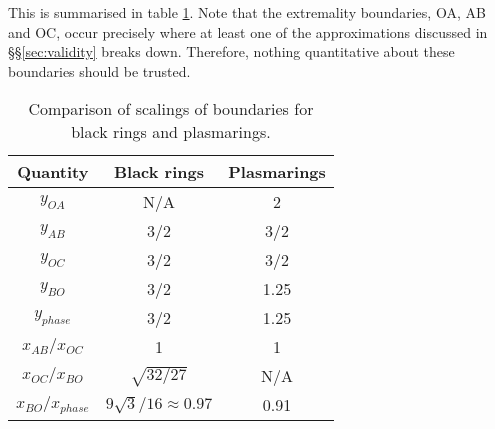 \documentclass[12pt,a4paper]{article}
\newcommand{\ra}{\rightarrow}
\newcommand{\tE}{\widetilde{E}}
\newcommand{\tL}{\widetilde{L}}
\begin{document}



This is summarised in table \ref{bndscale:tab}. Note that the
extremality boundaries, OA, AB and OC, occur precisely where at
least one of the approximations discussed in \S\S\ref{sec:validity}
breaks down. Therefore, nothing quantitative about these boundaries
should be trusted.


\begin{table}
  \centering
  \begin{tabular}{|c|c|c|}
    \hline
    Quantity & Black rings & Plasmarings \\
    \hline
    $y_{OA}$ & N/A & 2 \\
    $y_{AB}$ & 3/2 & 3/2 \\
    $y_{OC}$ & 3/2 & 3/2 \\
    $y_{BO}$ & 3/2 & 1.25 \\
    $y_{phase}$ & 3/2 & 1.25 \\
    \hline
    $x_{AB}/x_{OC}$ & 1 & 1 \\
    $x_{OC}/x_{BO}$ & $\sqrt{32/27}$ & N/A \\
    $x_{BO}/x_{phase}$ & $9\sqrt{3}/16 \approx 0.97$ & 0.91 \\
    \hline
  \end{tabular}
  \caption{Comparison of scalings of boundaries for black rings and
plasmarings.}\label{bndscale:tab}
\end{table}
\end{document}

